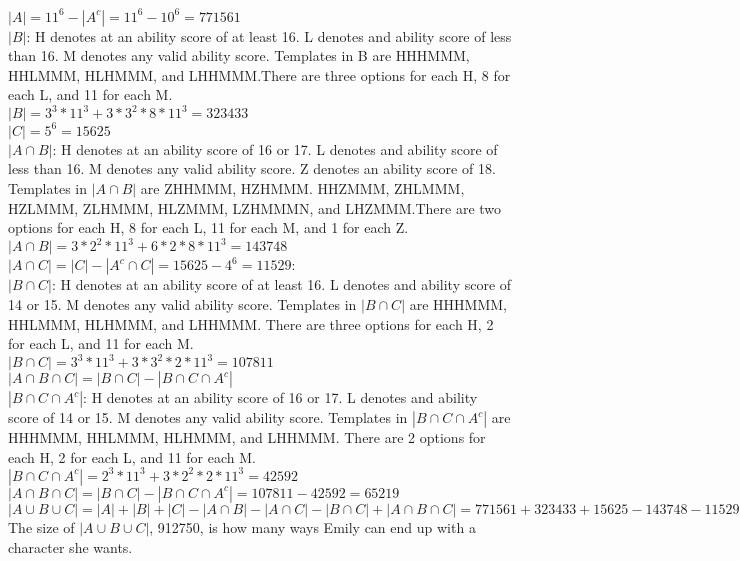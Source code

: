 \documentclass[10pt,letterpaper,unboxed,cm]{article}
\begin{document}
\begin{enumerate}
\begin{enumerate}
        $|A| = 11^6 - |A^c| = 11^6 - 10^6 = 771561$\\
        $|B|$: H denotes at an ability score of at least 16. L denotes and ability score of less than 16. M denotes any valid ability score. Templates in B are HHHMMM, HHLMMM, HLHMMM, and LHHMMM.There are three options for each H, 8 for each L, and 11 for each M.\\
        $|B| = 3^3*11^3 + 3*3^2*8*11^3 = 323433$\\
        $|C| = 5^6 = 15625$ \\
        $|A \cap B|$: H denotes at an ability score of 16 or 17. L denotes and ability score of less than 16. M denotes any valid ability score. Z denotes an ability score of 18. Templates in $|A \cap B|$ are ZHHMMM, HZHMMM. HHZMMM, ZHLMMM, HZLMMM, ZLHMMM, HLZMMM, LZHMMMN, and LHZMMM.There are two options for each H, 8 for each L, 11 for each M, and 1 for each Z.\\
        $|A \cap B| = 3*2^2*11^3 + 6*2*8*11^3 = 143748$
        \\
        $|A \cap C| = |C| - |A^c \cap C| = 15625 - 4^6 = 11529$: \\
        $|B \cap C|$: H denotes at an ability score of at least 16. L denotes and ability score of 14 or 15. M denotes any valid ability score. Templates in $|B \cap C|$ are HHHMMM, HHLMMM, HLHMMM, and LHHMMM. There are three options for each H, 2 for each L, and 11 for each M.\\
        $|B \cap C| = 3^3*11^3 + 3*3^2*2*11^3 = 107811$\\
        $|A \cap B \cap C| = |B \cap C| - |B \cap C \cap A^c|$ \\
        $|B \cap C \cap A^c|$: H denotes at an ability score of 16 or 17. L denotes and ability score of 14 or 15. M denotes any valid ability score. Templates in $|B \cap C \cap A^c|$ are HHHMMM, HHLMMM, HLHMMM, and LHHMMM. There are 2 options for each H, 2 for each L, and 11 for each M.\\
        $|B \cap C \cap A^c| = 2^3*11^3 + 3*2^2*2*11^3 = 42592$\\
        $|A \cap B \cap C| = |B \cap C| - |B \cap C \cap A^c| = 107811 - 42592 = 65219$\\
        $|A \cup B \cup C| = |A| + |B| + |C| - |A \cap B| - |A \cap C| - |B \cap C| + |A \cap B \cap C| = 771561 + 323433 + 15625 - 143748 - 11529 - 107811 + 65219 = 912750$\\ The size of $|A \cup B \cup C|$, 912750, is how many ways Emily can end up with a character she wants.
        

\end{enumerate}
\end{enumerate}
\end{document}
